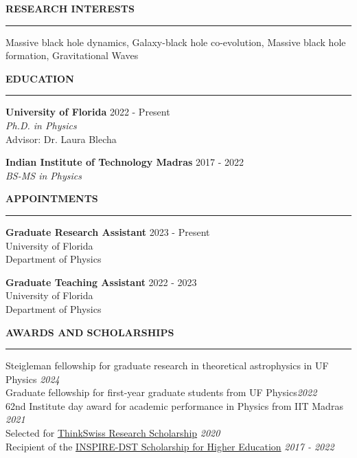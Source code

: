 \documentclass{resume} %
\renewenvironment{rSection}[1]{
\sectionskip
\textbf{\textcolor{C2}{\MakeUppercase{#1}}}
\sectionlineskip
\hrule
\begin{list}{}{
\setlength{\leftmargin}{1.5em}
}
\item[]
}{
\end{list}
}
\begin{document}
\begin{rSection}{Research Interests}
Massive black hole dynamics, Galaxy-black hole co-evolution, Massive black hole formation, Gravitational Waves

\end{rSection}

\begin{rSection}{Education}

\textbf{University of Florida} \hfill 2022 - Present \\
\emph{Ph.D. in Physics}\\
Advisor: Dr. Laura Blecha

\textbf{Indian Institute of Technology Madras} \hfill 2017 - 2022 \\
\emph{BS-MS in Physics}

\end{rSection}

\begin{rSection}{Appointments}

\textbf{Graduate Research Assistant
} \hfill 2023 - Present \\
University of Florida \\
Department of Physics 

\textbf{Graduate Teaching Assistant
} \hfill 2022 - 2023 \\
University of Florida \\
Department of Physics 

\end{rSection}

\begin{rSection}{Awards and scholarships} \itemsep -2pt 
{{\color{C3} Steigleman fellowship} for graduate research in theoretical astrophysics in UF Physics} \hfill {\em 2024}\\
{{\color{C3} Graduate fellowship} for first-year graduate students from UF Physics}\hfill {\em 2022} \\
{{\color{C3} 62nd Institute day} award for academic performance in Physics from IIT Madras} \hfill {\em 2021} \\
{Selected for \href{https://swissnex.org/india/thinkswiss/}{ThinkSwiss Research Scholarship}} \hfill {\em 2020}\\
{Recipient of the \href{http://www.inspire-dst.gov.in/scholarship.html}{INSPIRE-DST Scholarship for Higher Education}} \hfill {\em 2017 - 2022}
\end{rSection}
\end{document}
